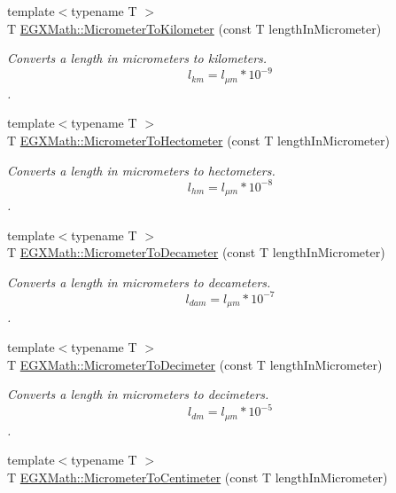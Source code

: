 \begin{DoxyCompactItemize}
{\footnotesize template$<$typename T $>$ }\\T \mbox{\hyperlink{group___e_g_x_math-_conversions-_length_conversions-_micrometer-_s_i_ga50cbd73dda2b126fc5b4425ee80cb3fb}{E\+G\+X\+Math\+::\+Micrometer\+To\+Kilometer}} (const T length\+In\+Micrometer)
\begin{DoxyCompactList}\small\item\em Converts a length in micrometers to kilometers. \[ l_{km}=l_{\mu m} * 10^{-9} \]. \end{DoxyCompactList}\item 
{\footnotesize template$<$typename T $>$ }\\T \mbox{\hyperlink{group___e_g_x_math-_conversions-_length_conversions-_micrometer-_s_i_ga49b0782446259c1f19927b5ecaff2f12}{E\+G\+X\+Math\+::\+Micrometer\+To\+Hectometer}} (const T length\+In\+Micrometer)
\begin{DoxyCompactList}\small\item\em Converts a length in micrometers to hectometers. \[ l_{hm}=l_{\mu m} * 10^{-8} \]. \end{DoxyCompactList}\item 
{\footnotesize template$<$typename T $>$ }\\T \mbox{\hyperlink{group___e_g_x_math-_conversions-_length_conversions-_micrometer-_s_i_ga871166cc6e314c09456a06cfb84ef62a}{E\+G\+X\+Math\+::\+Micrometer\+To\+Decameter}} (const T length\+In\+Micrometer)
\begin{DoxyCompactList}\small\item\em Converts a length in micrometers to decameters. \[ l_{dam}=l_{\mu m} * 10^{-7} \]. \end{DoxyCompactList}\item 
{\footnotesize template$<$typename T $>$ }\\T \mbox{\hyperlink{group___e_g_x_math-_conversions-_length_conversions-_micrometer-_s_i_ga9defee7c838f9b14acd0dc19931309fa}{E\+G\+X\+Math\+::\+Micrometer\+To\+Decimeter}} (const T length\+In\+Micrometer)
\begin{DoxyCompactList}\small\item\em Converts a length in micrometers to decimeters. \[ l_{dm}=l_{\mu m} * 10^{-5} \]. \end{DoxyCompactList}\item 
{\footnotesize template$<$typename T $>$ }\\T \mbox{\hyperlink{group___e_g_x_math-_conversions-_length_conversions-_micrometer-_s_i_ga43ca5990e1bddd832e2fe0cf8fff879f}{E\+G\+X\+Math\+::\+Micrometer\+To\+Centimeter}} (const T length\+In\+Micrometer)

\end{DoxyCompactItemize}
